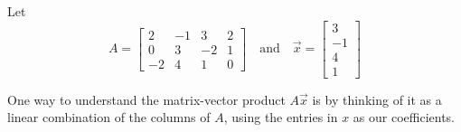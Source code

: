 \documentclass{ximera}
\begin{document}
\begin{example}\label{exp:matrixvectormultdef}
Let $$A=\begin{bmatrix}2&-1&3&2\\0&3&-2&1\\-2&4&1&0\end{bmatrix}\quad\text{and}\quad \vec{x}=\begin{bmatrix}3\\-1\\4\\1\end{bmatrix}$$ %





One way to understand the matrix-vector product $A\vec{x}$ is by thinking of it as a linear combination of the columns of $A$, using the entries in $x$ as our coefficients.  %




\end{example}
\end{document}
